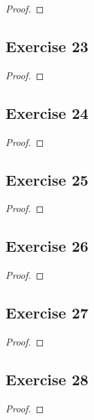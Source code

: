 \documentclass[14pt]{extarticle}
\begin{document}
\begin{proof}

\end{proof}

\subsection{Exercise 23}

\begin{proof}

\end{proof}

\subsection{Exercise 24}

\begin{proof}

\end{proof}

\subsection{Exercise 25}

\begin{proof}

\end{proof}

\subsection{Exercise 26}

\begin{proof}

\end{proof}

\subsection{Exercise 27}

\begin{proof}

\end{proof}

\subsection{Exercise 28}

\begin{proof}

\end{proof}
\end{document}
